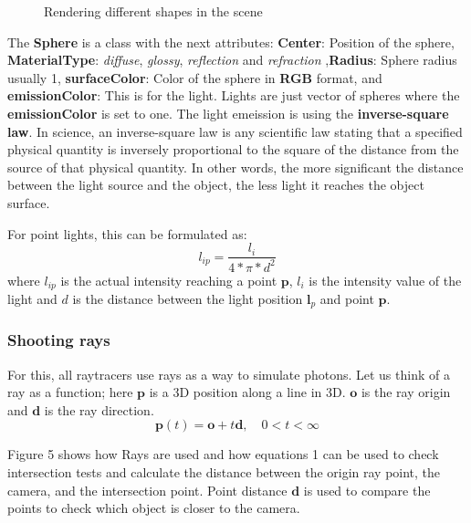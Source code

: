 \documentclass[11pt,a4paper]{article}
\begin{document}
\begin{figure}[ht]
\begin{center}
		\caption{Rendering different shapes in the scene}
		\label{fig:5}
		
	\end{center}
\end{figure}

    The \textbf{Sphere} is a class with the next attributes: \textbf{Center}: Position of the sphere, \textbf{MaterialType}: \textit{diffuse}, \textit{glossy}, \textit{reflection} and \textit{refraction} ,\textbf{Radius}: Sphere radius usually 1, \textbf{surfaceColor}: Color of the sphere in \textbf{RGB} format, and \textbf{emissionColor}: This is for the light.   
	Lights are just vector of spheres where the \textbf{emissionColor} is set to one. The light emeission is using the \textbf{inverse-square law}. In science, an inverse-square law is any scientific law stating that a specified physical quantity is inversely proportional to the square of the distance from the source of that physical quantity. In other words, the more significant the distance between the light source and the object, the less light it reaches the object surface.
	
		\noindent For point lights, this can be formulated as:
	\begin{equation}
		l_{ip} = \frac{l_{i}}{4 * \pi * d^2}
	\end{equation}
	where $l_{ip}$ is the actual intensity reaching a point $\boldsymbol{p}$, $l_{i}$ is the intensity value of the light and $d$ is the distance between the light position $\boldsymbol{l}_{p}$ and point $\boldsymbol{p}$.
	\subsubsection*{Shooting rays}
		For this, all raytracers use rays as a way to simulate photons. Let us think of a ray as a function; here $\pmb{p} $ is a 3D position along a line in 3D. $\pmb{o} $ is the ray origin and $\pmb{d} $ is the ray direction.
	\begin{equation}
		\pmb{p} (t) = \pmb{o} + t\pmb{d} ,  \quad  0 < t < \infty
	\end{equation}
	
	Figure 5 shows how Rays are used and how equations 1 can be used to check intersection tests and calculate the distance between the origin ray point, the camera, and the intersection point.  Point distance $\pmb{d} $ is used to compare the points to check which object is closer to the camera. 
	
\end{document}
